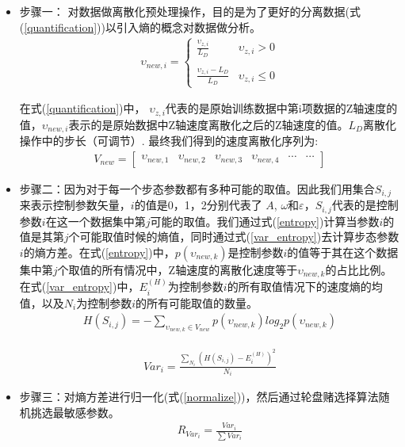 \begin{itemize}
	\item 步骤一： 对数据做离散化预处理操作，目的是为了更好的分离数据(式(\ref{quantification}))以引入熵的概念对数据做分析。
	\begin{eqnarray}\label{quantification}
	\upsilon_{new,i}=\left\{
	\begin{array}{lr}
	\frac{\upsilon_{z,i}}{L_{D}} &\upsilon_{z,i}> 0\\
	\\
	\frac{\upsilon_{z,i}-L_{D}}{L_{D}} &\upsilon_{z,i}\leq 0
	\end{array}
	\right.
	\end{eqnarray}
	
	在式(\ref{quantification})中， $\upsilon_{z,i}$代表的是原始训练数据中第i项数据的Z轴速度的值，$\upsilon_{new,i}$表示的是原始数据中Z轴速度离散化之后的Z轴速度的值。$L_{D}$离散化操作中的步长（可调节）. 最终我们得到的速度离散化序列为:
	\begin{eqnarray}\label{newMember}
	V_{new}=\begin{bmatrix}
	\upsilon_{new,1} & \upsilon_{new,2} & \upsilon_{new,3} & \upsilon_{new,4} & \cdots & \cdots
	\end{bmatrix}
	\end{eqnarray}
	
	\item 步骤二：因为对于每一个步态参数都有多种可能的取值。因此我们用集合$S_{i,j}$来表示控制参数矢量，$i$的值是0，1，2分别代表了 $A$, $\omega$和$\varepsilon$，$S_{i,j}$代表的是控制参数$i$在这一个数据集中第$j$可能的取值。我们通过式(\ref{entropy})计算当参数$i$的值是其第$j$个可能取值时候的熵值，同时通过式(\ref{var_entropy})去计算步态参数$i$的熵方差。在式(\ref{entropy})中，$p(\upsilon_{new,k})$是控制参数$i$的值等于其在这个数据集中第$j$个取值的所有情况中，Z轴速度的离散化速度等于$\upsilon_{new,k}$的占比比例。在式(\ref{var_entropy})中，$E^{(H)}_{i}$为控制参数$i$的所有取值情况下的速度熵的均值，以及$N_{i}$为控制参数$i$的所有可能取值的数量。
	\begin{eqnarray}\label{entropy}
	H(S_{i,j})=-\sum _{\upsilon_{new,k}\in V_{new}}p(\upsilon_{new,k})log_{2}p(\upsilon_{new,k})
	\end{eqnarray}
	
	\begin{eqnarray}\label{var_entropy}
	Var_{i}=\frac{\sum _{N_{i}}(H(S_{i,j})-E^{(H)}_{i})^{2}}{N_{i}}
	\end{eqnarray}
	
	\item 步骤三：对熵方差进行归一化(式(\ref{normalize}))，然后通过轮盘赌选择算法随机挑选最敏感参数。
	\begin{eqnarray}\label{normalize}
	R_{Var_{i}}=\frac{Var_{i}}{\sum Var_{i}}
	\end{eqnarray}
	
\end{itemize}

